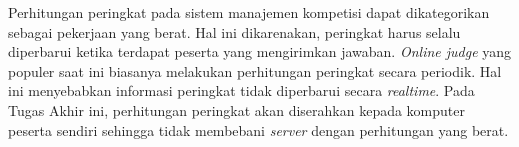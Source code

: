 \par Perhitungan peringkat pada sistem manajemen kompetisi dapat dikategorikan sebagai pekerjaan yang berat. Hal ini dikarenakan, peringkat harus selalu diperbarui ketika terdapat peserta yang mengirimkan jawaban. \textit{Online judge} yang populer saat ini biasanya melakukan perhitungan peringkat secara periodik. Hal ini menyebabkan informasi peringkat tidak diperbarui secara \textit{realtime}. Pada Tugas Akhir ini, perhitungan peringkat akan diserahkan kepada komputer peserta sendiri sehingga tidak membebani \textit{server} dengan perhitungan yang berat.
